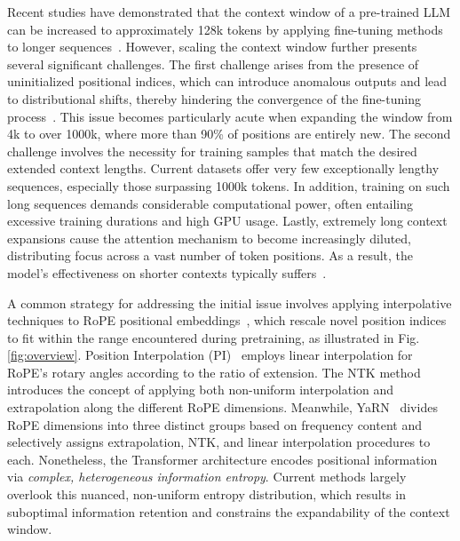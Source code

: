 Recent studies have demonstrated that the context window of a pre-trained LLM can be increased to approximately 128k tokens by applying fine-tuning methods to longer sequences~\cite{longlora,pi,yarn,zhang2024soaring,liu2023scaling}. However, scaling the context window further presents several significant challenges. The first challenge arises from the presence of uninitialized positional indices, which can introduce anomalous outputs and lead to distributional shifts, thereby hindering the convergence of the fine-tuning process~\cite{pi}. This issue becomes particularly acute when expanding the window from 4k to over 1000k, where more than 90\% of positions are entirely new. The second challenge involves the necessity for training samples that match the desired extended context lengths. Current datasets offer very few exceptionally lengthy sequences, especially those surpassing 1000k tokens. In addition, training on such long sequences demands considerable computational power, often entailing excessive training durations and high GPU usage. Lastly, extremely long context expansions cause the attention mechanism to become increasingly diluted, distributing focus across a vast number of token positions. As a result, the model’s effectiveness on shorter contexts typically suffers~\cite{pi}.

A common strategy for addressing the initial issue involves applying interpolative techniques to RoPE positional embeddings~\cite{rope,pi}, which rescale novel position indices to fit within the range encountered during pretraining, as illustrated in Fig.\ref{fig:overview}. Position Interpolation (PI)~\cite{pi} employs linear interpolation for RoPE's rotary angles according to the ratio of extension. The NTK method~\cite{ntk,dynamicntk} introduces the concept of applying both non-uniform interpolation and extrapolation along the different RoPE dimensions. Meanwhile, YaRN~\cite{yarn} divides RoPE dimensions into three distinct groups based on frequency content and selectively assigns extrapolation, NTK, and linear interpolation procedures to each. Nonetheless, the Transformer architecture encodes positional information via \emph{complex, heterogeneous information entropy}. Current methods largely overlook this nuanced, non-uniform entropy distribution, which results in suboptimal information retention and constrains the expandability of the context window.

